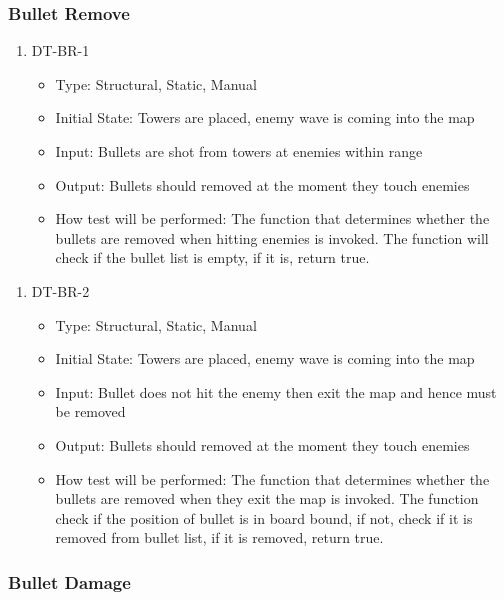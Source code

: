 \documentclass[12,english]{article}
\begin{document}
\subsubsection{Bullet Remove}
\begin{enumerate}
    \item DT-BR-1
    \begin{itemize}
        \item Type: Structural, Static, Manual
        \item Initial State: Towers are placed, enemy wave is coming into the map
        \item Input: Bullets are shot from towers at enemies within range
        \item Output: Bullets should removed at the moment they touch enemies
        \item How test will be performed: The function that determines whether the bullets are removed when hitting enemies is invoked. The function will check if the bullet list is empty, if it is, return true.
    \end{itemize}
\end{enumerate}

\begin{enumerate}
    \item DT-BR-2
    \begin{itemize}
        \item Type: Structural, Static, Manual
        \item Initial State: Towers are placed, enemy wave is coming into the map
        \item Input: Bullet does not hit the enemy then exit the map and hence must be removed
        \item Output: Bullets should removed at the moment they touch enemies
        \item How test will be performed: The function that determines whether the bullets are removed when they exit the map is invoked. The function check if the position of bullet is in board bound, if not, check if it is removed from bullet list, if it is removed, return true.
    \end{itemize}
\end{enumerate}

\subsubsection{Bullet Damage}
\end{document}
